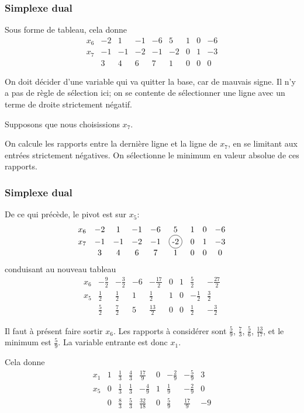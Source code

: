 \documentclass[t,usepdftitle=false]{beamer}
\newcommand*\circled[1]{\tikz[baseline=(char.base)]{
    \node[shape=circle,draw,inner sep=2pt] (char) {#1};}}
\begin{document}
\begin{frame}
\frametitle{Simplexe dual}

Sous forme de tableau, cela donne
\[
\begin{matrix}
x_6 & -2 & 1 & -1 & -6 & 5 & 1 & 0 & -6 \\
x_7 & -1 & -1 & -2 & -1 & -2 & 0 & 1 & -3 \\
& 3 & 4 & 6 & 7 & 1 & 0 & 0 & 0
\end{matrix}
\]

On doit décider d'une variable qui va quitter la base, car de mauvais signe. Il n'y a pas de règle de sélection ici; on se contente de sélectionner une ligne avec un terme de droite strictement négatif.

\mbox{}

Supposons que nous choisissions $x_7$.

\mbox{}

On calcule les rapports entre la dernière ligne et la ligne de $x_7$, en se limitant aux entrées strictement négatives. On sélectionne le minimum en valeur absolue de ces rapports.
\end{frame}

\begin{frame}
\frametitle{Simplexe dual}

De ce qui précède, le pivot est sur $x_5$:
\[
\begin{matrix}
x_6 & -2 & 1 & -1 & -6 & 5 & 1 & 0 & -6 \\
x_7 & -1 & -1 & -2 & -1 & \circled{-2} & 0 & 1 & -3 \\
& 3 & 4 & 6 & 7 & 1 & 0 & 0 & 0
\end{matrix}
\]
conduisant au nouveau tableau
\[
\begin{matrix}
x_6 & -\frac{9}{2} & -\frac{3}{2} & -6 & -\frac{17}{2} & 0 & 1 & \frac{5}{2} & -\frac{27}{2} \\
x_5 & \frac{1}{2} & \frac{1}{2} & 1 & \frac{1}{2} & 1 & 0 & -\frac{1}{2} & \frac{3}{2} \\
& \frac{5}{2} & \frac{7}{2} & 5 & \frac{13}{2} & 0 & 0 & \frac{1}{2} & -\frac{3}{2}
\end{matrix}
\]

Il faut à présent faire sortir $x_6$. Les rapports à considérer sont $\frac{5}{9}$, $\frac{7}{3}$, $\frac{5}{6}$, $\frac{13}{17}$, et le minimum est $\frac{5}{9}$. La variable entrante est donc $x_1$.

Cela donne
\[
\begin{matrix}
x_1 & 1 & \frac{1}{3} & \frac{4}{3} & \frac{17}{9} & 0 & -\frac{2}{9} & -\frac{5}{9} & 3 \\
x_5 & 0 & \frac{1}{3} & \frac{1}{3} & -\frac{4}{9} & 1 & \frac{1}{9} & -\frac{2}{9} & 0 \\
& 0 & \frac{8}{3} & \frac{5}{3} & \frac{32}{18} & 0 & \frac{5}{9} & \frac{17}{9} & -9
\end{matrix}
\]
\end{frame}
\end{document}
